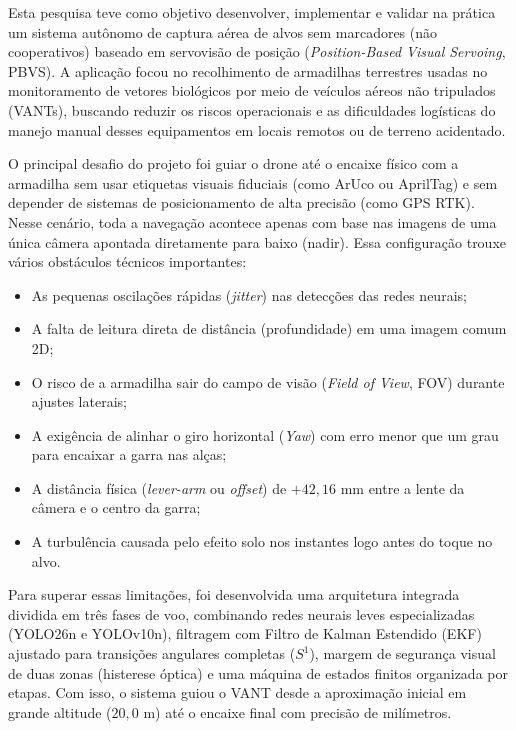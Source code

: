 
Esta pesquisa teve como objetivo desenvolver, implementar e validar na prática um sistema autônomo de captura aérea de alvos sem marcadores (não cooperativos) baseado em servovisão de posição (\textit{Position-Based Visual Servoing}, PBVS). A aplicação focou no recolhimento de armadilhas terrestres usadas no monitoramento de vetores biológicos por meio de veículos aéreos não tripulados (VANTs), buscando reduzir os riscos operacionais e as dificuldades logísticas do manejo manual desses equipamentos em locais remotos ou de terreno acidentado.

O principal desafio do projeto foi guiar o drone até o encaixe físico com a armadilha sem usar etiquetas visuais fiduciais (como ArUco ou AprilTag) e sem depender de sistemas de posicionamento de alta precisão (como GPS RTK). Nesse cenário, toda a navegação acontece apenas com base nas imagens de uma única câmera apontada diretamente para baixo (nadir). Essa configuração trouxe vários obstáculos técnicos importantes: 

\begin{itemize}
	\item As pequenas oscilações rápidas (\textit{jitter}) nas detecções das redes neurais; 
	\item A falta de leitura direta de distância (profundidade) em uma imagem comum 2D; 
	\item O risco de a armadilha sair do campo de visão (\textit{Field of View}, FOV) durante ajustes laterais; 
	\item A exigência de alinhar o giro horizontal (\textit{Yaw}) com erro menor que um grau para encaixar a garra nas alças; 
	\item A distância física (\textit{lever-arm} ou \textit{offset}) de $+42{,}16\text{ mm}$ entre a lente da câmera e o centro da garra;
	\item A turbulência causada pelo efeito solo nos instantes logo antes do toque no alvo.
\end{itemize}

Para superar essas limitações, foi desenvolvida uma arquitetura integrada dividida em três fases de voo, combinando redes neurais leves especializadas (YOLO26n e YOLOv10n), filtragem com Filtro de Kalman Estendido (EKF) ajustado para transições angulares completas ($S^1$), margem de segurança visual de duas zonas (histerese óptica) e uma máquina de estados finitos organizada por etapas. Com isso, o sistema guiou o VANT desde a aproximação inicial em grande altitude ($20{,}0\text{ m}$) até o encaixe final com precisão de milímetros.

